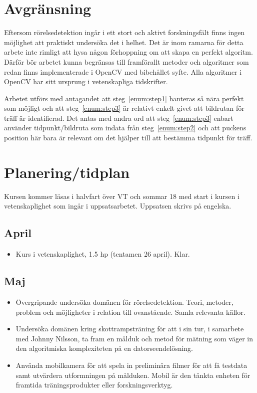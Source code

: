 \documentclass[a4paper,12pt]{article}
\begin{document}
\section*{Avgränsning}
Eftersom rörelsedetektion ingår i ett stort och aktivt forskningsfält finns
ingen möjlighet att praktiskt undersöka det i helhet. Det är inom ramarna
för detta arbete inte rimligt att hysa någon förhoppning om att skapa en
perfekt algoritm. Därför bör arbetet kunna begränsas till framförallt metoder
och algoritmer som redan finns implementerade i OpenCV med bibehållet syfte.
Alla algoritmer i OpenCV har sitt ursprung i vetenskapliga tidskrifter.

Arbetet utförs med antagandet att steg~\ref{enum:step1} hanteras så nära
perfekt som möjligt och att steg~\ref{enum:step3} är relativt enkelt givet
att bildrutan för träff är identifierad. Det antas med andra ord att
steg~\ref{enum:step3} enbart använder tidpunkt/bildruta som indata från
steg~\ref{enum:step2} och att puckens position här bara är relevant om det
hjälper till att bestämma tidpunkt för träff.


\pagebreak
\section*{Planering/tidplan}
Kursen kommer läsas i halvfart över VT och sommar 18 med start i
kursen i vetenskaplighet som ingår i uppsatsarbetet. Uppsatsen skrivs på
engelska.

\subsection*{April}
\begin{itemize}
  \item Kurs i vetenskaplighet, 1.5 hp (tentamen 26 april). Klar.
\end{itemize}

\subsection*{Maj}
\begin{itemize}
  \item Övergripande undersöka domänen för rörelsedetektion. Teori, metoder,
    problem och möjligheter i relation till ovanstående. Samla relevanta
    källor.
  \item Undersöka domänen kring skottrampsträning för att i sin tur, i
    samarbete med Johnny Nilsson, ta fram en målduk och metod för mätning
    som väger in den algoritmiska komplexiteten på en datorseendelösning.
  \item Använda mobilkamera för att spela in preliminära filmer för
    att få testdata samt utvärdera utformningen på målduken.
    Mobil är den tänkta enheten för framtida träningsprodukter eller
    forskningsverktyg.
\end{itemize}
\end{document}
